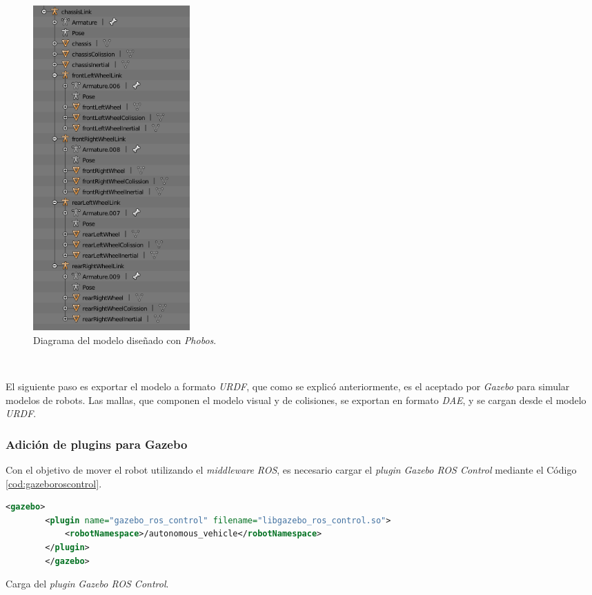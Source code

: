 \begin{figure} [h!]
	\begin{center}
		\includegraphics[width=6cm]{figs/phobosDiagram}
	\end{center}
	\caption{Diagrama del modelo diseñado con \textit{Phobos}.}
	\label{fig:blenderdiagram}
\end{figure}\

El siguiente paso es exportar el modelo a formato \textit{URDF}, que como se explicó anteriormente, es el aceptado por \textit{Gazebo} para simular modelos de robots. Las mallas,
que componen el modelo visual y de colisiones, se exportan en formato \textit{DAE}, y se cargan desde el modelo \textit{URDF}.\\

\subsubsection{Adición de plugins para Gazebo}

Con el objetivo de mover el robot utilizando el \textit{middleware ROS}, es necesario cargar el \textit{plugin} \textit{Gazebo ROS Control} mediante el Código
\ref{cod:gazeboroscontrol}.\\

\begin{code}[h]
	\begin{lstlisting}[language=XML]
		<gazebo>
		<plugin name="gazebo_ros_control" filename="libgazebo_ros_control.so">
			<robotNamespace>/autonomous_vehicle</robotNamespace>
		</plugin>
		</gazebo>
	\end{lstlisting}
	\caption[Carga del \textit{plugin} \textit{Gazebo ROS Control}.]{Carga del \textit{plugin} \textit{Gazebo ROS Control}.}
	\label{cod:gazeboroscontrol}
\end{code}

